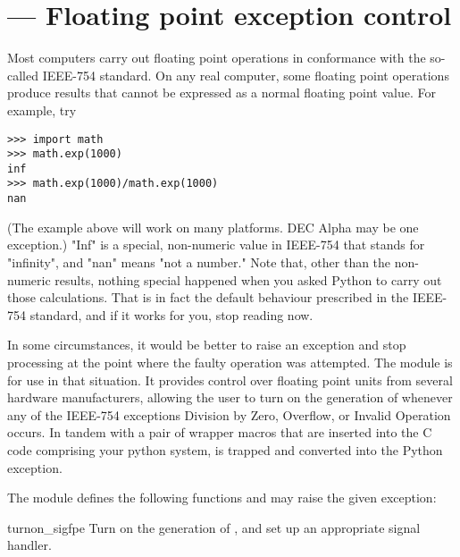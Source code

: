 \section{ ---
         Floating point exception control}


Most computers carry out floating point operations
in conformance with the so-called IEEE-754 standard.
On any real computer,
some floating point operations produce results that cannot
be expressed as a normal floating point value.
For example, try

\begin{verbatim}
>>> import math
>>> math.exp(1000)
inf
>>> math.exp(1000)/math.exp(1000)
nan
\end{verbatim}

(The example above will work on many platforms.
DEC Alpha may be one exception.)
"Inf" is a special, non-numeric value in IEEE-754 that
stands for "infinity", and "nan" means "not a number."
Note that,
other than the non-numeric results,
nothing special happened when you asked Python
to carry out those calculations.
That is in fact the default behaviour prescribed in the IEEE-754 standard,
and if it works for you,
stop reading now.

In some circumstances,
it would be better to raise an exception and stop processing
at the point where the faulty operation was attempted.
The  module
is for use in that situation.
It provides control over floating point
units from several hardware manufacturers,
allowing the user to turn on the generation
of  whenever any of the
IEEE-754 exceptions Division by Zero, Overflow, or
Invalid Operation occurs.
In tandem with a pair of wrapper macros that are inserted
into the C code comprising your python system,
 is trapped and converted into the Python
 exception.

The  module defines the following functions and
may raise the given exception:

\begin{funcdesc}{turnon_sigfpe}{}
Turn on the generation of ,
and set up an appropriate signal handler.
\end{funcdesc}

